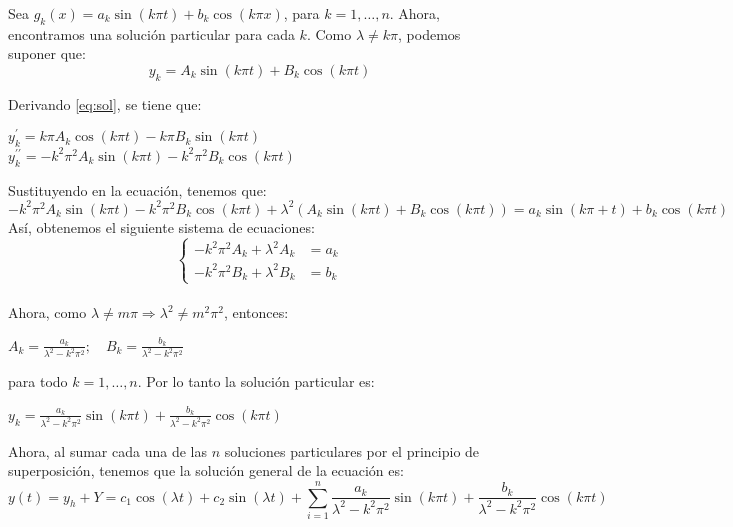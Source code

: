 Sea $g_{k}(x)=a_{k} \sin (k \pi t) + b_{k}\cos{(k\pi x)}$, para $k=1, \ldots, n$. Ahora, encontramos una solución particular para cada $k$. Como $\lambda \neq k \pi$, podemos suponer que:\\

\begin{equation}
 y_{k}=A_{k} \sin (k \pi t)+B_{k} \cos (k \pi t)
\label{eq:sol} 
\end{equation}



Derivando \ref{eq:sol}, se tiene que:\\

\begin{center}
   $y_{k}^{\prime}=k \pi A_{k} \cos (k \pi t)-k \pi B_{k} \sin (k \pi t)$ \\
    
    $y_{k}^{\prime \prime}=-k^{2} \pi^{2} A_{k} \sin (k \pi t)-k^{2} \pi^{2} B_{k} \cos (k \pi t)$
\end{center}

Sustituyendo en la ecuación, tenemos que:\\

$-k^{2} \pi^{2} A_{k} \sin (k \pi t)-k^{2} \pi^{2} B_{k} \cos (k \pi t)+\lambda^{2}\left(A_{k} \sin (k \pi t)+B_{k} \cos (k \pi t)\right)=a_{k} \sin (k \pi +  t)+ b_{k} \cos (k \pi t)$\\

Así, obtenemos el siguiente sistema de ecuaciones:\\
$$
\left\{\begin{array}{ll}
-k^{2} \pi^{2} A_{k}+\lambda^{2} A_{k} & =a_{k} \\
-k^{2} \pi^{2} B_{k}+\lambda^{2} B_{k} & =b_{k}
\end{array}\right.
$$\\

Ahora, como $\lambda \neq m \pi \Rightarrow \lambda^{2} \neq m^{2} \pi^{2}$, entonces:

\begin{center}

$A_{k}=\frac{a_{k}}{\lambda^{2}-k^{2} \pi^{2}} ; \quad B_{k}=\frac{b_{k}}{\lambda^{2}-k^{2} \pi^{2}}$

\end{center}

para todo $k=1, \ldots, n$. Por lo tanto la solución particular es:\\

\begin{center}

$y_{k}=\frac{a_{k}}{\lambda^{2}-k^{2} \pi^{2}} \sin (k \pi t) + \frac{b_{k}}{\lambda^{2}-k^{2} \pi^{2}} \cos (k \pi t)$

\end{center}

Ahora, al sumar cada una de las $n$ soluciones particulares por el principio de superposición, tenemos que la solución general de la ecuación es:\\
$$
y(t)= y_{h} + Y = c_{1} \cos (\lambda t)+c_{2} \sin (\lambda t)+\sum_{i=1}^{n} \frac{a_{k}}{\lambda^{2}-k^{2} \pi^{2}} \sin (k \pi t) + \frac{b_{k}}{\lambda^{2}-k^{2} \pi^{2}} \cos (k \pi t)
$$